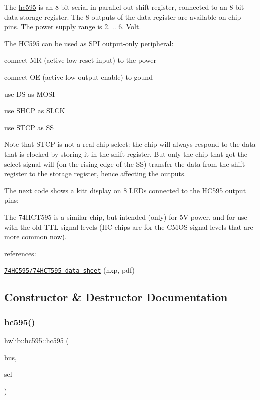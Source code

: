 The \hyperlink{classhwlib_1_1hc595}{hc595} is an 8-\/bit serial-\/in parallel-\/out shift register, connected to an 8-\/bit data storage register. The 8 outputs of the data register are available on chip pins. The power supply range is 2. .. 6. Volt.



The H\+C595 can be used as S\+PI output-\/only peripheral\+:
\begin{DoxyItemize}
\item connect MR (active-\/low reset input) to the power
\item connect OE (active-\/low output enable) to gound
\item use DS as M\+O\+SI
\item use S\+H\+CP as S\+L\+CK
\item use S\+T\+CP as SS
\end{DoxyItemize}

Note that S\+T\+CP is not a real chip-\/select\+: the chip will always respond to the data that is clocked by storing it in the shift register. But only the chip that got the select signal will (on the rising edge of the SS) transfer the data from the shift register to the storage register, hence affecting the outputs.

The next code shows a kitt display on 8 L\+E\+Ds connected to the H\+C595 output pins\+: 
\begin{DoxyCodeInclude}
\end{DoxyCodeInclude}
 The 74\+H\+C\+T595 is a similar chip, but intended (only) for 5V power, and for use with the old T\+TL signal levels (HC chips are for the C\+M\+OS signal levels that are more common now).

references\+:
\begin{DoxyItemize}
\item \href{https://www.nxp.com/documents/data_sheet/74HC_HCT595.pdf}{\tt 74\+H\+C595/74\+H\+C\+T595 data sheet} (nxp, pdf) 
\end{DoxyItemize}

\subsection{Constructor \& Destructor Documentation}
\mbox{\label{classhwlib_1_1hc595_a293236ae5bd14fa376d8b540324f07c0}} 
\subsubsection{\texorpdfstring{hc595()}{hc595()}}
{\footnotesize\ttfamily hwlib\+::hc595\+::hc595 (\begin{DoxyParamCaption}\item[{\hyperlink{classhwlib_1_1spi__bus}{spi\+\_\+bus} \&}]{bus,  }\item[{\hyperlink{classhwlib_1_1pin__out}{pin\+\_\+out} \&}]{sel }\end{DoxyParamCaption})\hspace{0.3cm}{\ttfamily [inline]}}

